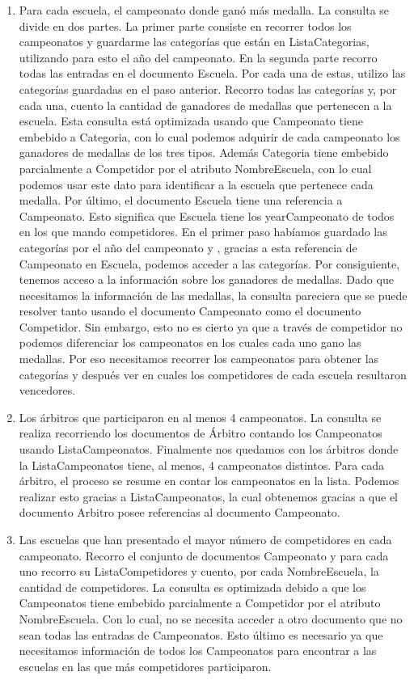 \begin{enumerate}
\item Para cada escuela, el campeonato donde ganó más medalla. La consulta se divide en dos partes. La primer parte consiste
en recorrer todos los campeonatos y guardarme las categorías que están en ListaCategorias, utilizando para esto el año del
campeonato. En la segunda parte recorro todas las entradas en el documento Escuela. Por cada una de estas, utilizo las
categorías guardadas en el paso anterior. Recorro todas las categorías y, por cada una, cuento la cantidad de ganadores de
medallas que pertenecen a la escuela. Esta consulta está optimizada usando que Campeonato tiene embebido a Categoria, con lo
cual podemos adquirir de cada campeonato los ganadores de medallas de los tres tipos. Además Categoria tiene embebido parcialmente
a Competidor por el atributo NombreEscuela, con lo cual podemos usar este dato para identificar a la escuela que pertenece cada
medalla. Por último, el documento Escuela tiene una referencia a Campeonato. Esto significa que Escuela tiene los yearCampeonato
de todos en los que mando competidores. En el primer paso habíamos guardado las categorías por el año del campeonato y ,
gracias a esta referencia de Campeonato en Escuela, podemos acceder a las categorías. Por consiguiente, tenemos acceso a la
información sobre los ganadores de medallas. Dado que necesitamos la información de las medallas, la consulta pareciera que
se puede resolver tanto usando el documento Campeonato como el documento Competidor. Sin embargo, esto no es cierto ya que
a través de competidor no podemos diferenciar los campeonatos en los cuales cada uno gano las medallas. Por eso necesitamos recorrer
los campeonatos para obtener las categorías y después ver en cuales los competidores de cada escuela resultaron vencedores.

\item Los árbitros que participaron en al menos 4 campeonatos. La consulta se realiza recorriendo los documentos
de Árbitro contando los Campeonatos usando ListaCampeonatos. Finalmente nos quedamos con los árbitros donde la ListaCampeonatos
tiene, al menos, 4 campeonatos distintos. Para cada árbitro, el proceso se resume en contar los campeonatos en la lista.
Podemos realizar esto gracias a ListaCampeonatos, la cual obtenemos gracias a que el documento Arbitro posee referencias
al documento Campeonato.

\item Las escuelas que han presentado el mayor número de competidores en cada campeonato. Recorro el conjunto de documentos
Campeonato y para cada uno recorro su ListaCompetidores y cuento, por cada NombreEscuela, la cantidad de competidores.
La consulta es optimizada debido a que los Campeonatos tiene embebido parcialmente a Competidor por el atributo
NombreEscuela. Con lo cual, no se necesita acceder a otro documento que no sean todas las entradas de Campeonatos.
Esto último es necesario ya que necesitamos información de todos los Campeonatos para encontrar a las escuelas en las
que más competidores participaron.


\end{enumerate}
